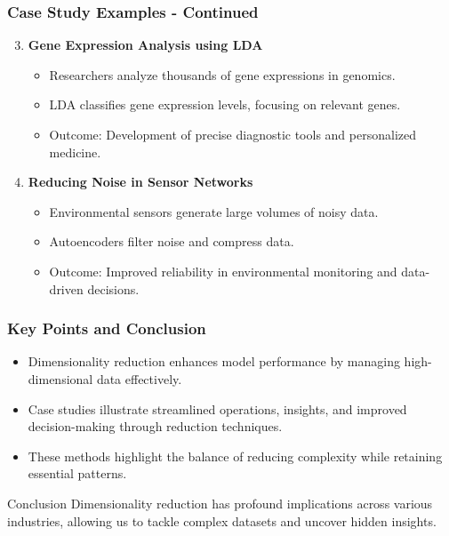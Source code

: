 \documentclass[aspectratio=169]{beamer}
\begin{document}
\begin{frame}[fragile]
    \frametitle{Case Study Examples - Continued}
    \begin{enumerate}
        \setcounter{enumi}{2} %
        \item \textbf{Gene Expression Analysis using LDA}
            \begin{itemize}
                \item Researchers analyze thousands of gene expressions in genomics.
                \item LDA classifies gene expression levels, focusing on relevant genes.
                \item Outcome: Development of precise diagnostic tools and personalized medicine.
            \end{itemize}
        \item \textbf{Reducing Noise in Sensor Networks}
            \begin{itemize}
                \item Environmental sensors generate large volumes of noisy data.
                \item Autoencoders filter noise and compress data.
                \item Outcome: Improved reliability in environmental monitoring and data-driven decisions.
            \end{itemize}
    \end{enumerate}
\end{frame}

\begin{frame}[fragile]
    \frametitle{Key Points and Conclusion}
    \begin{itemize}
        \item Dimensionality reduction enhances model performance by managing high-dimensional data effectively.
        \item Case studies illustrate streamlined operations, insights, and improved decision-making through reduction techniques.
        \item These methods highlight the balance of reducing complexity while retaining essential patterns.
    \end{itemize}
    \begin{block}{Conclusion}
        Dimensionality reduction has profound implications across various industries, allowing us to tackle complex datasets and uncover hidden insights.
    \end{block}
\end{frame}
\end{document}
